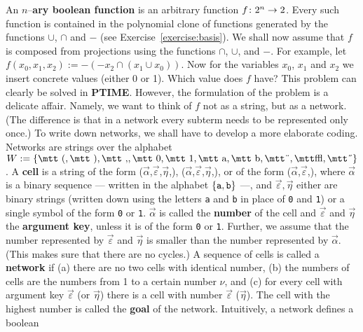 An $n$--\textbf{ary boolean function} 
is an arbitrary function
$f \colon 2^n \rightarrow 2$. Every such function is contained in the
polynomial clone of functions generated by the functions $\cup$,
$\cap$ and $-$ (see Exercise~\ref{exercise:basis}). We shall now 
assume that $f$ is composed from projections using the functions 
$\cap$, $\cup$, and $-$. For example, let 
$f(x_0, x_1, x_2) := - (- x_2 \cap (x_1 \cup x_0))$.
Now for the variables $x_0$, $x_1$ and $x_2$ we insert concrete
values (either 0 or 1). Which value does $f$ have? This problem 
can clearly be solved in {\bf PTIME}. However, the formulation of 
the problem is a delicate affair. Namely, we want to think of 
$f$ not as a string, but as a network. (The difference is that 
in a network every subterm needs to be represented only once.)
To write down networks, we shall have to develop a more elaborate 
coding. Networks are strings over the alphabet 
$W := \{\mbox{\mtt (}, \mbox{\mtt )}, \mbox{\mtt ,},
\mbox{\mtt 0}, \mbox{\mtt 1}, \mbox{\mtt a}, \mbox{\mtt b},
\mbox{\mtt\symbol{4}}, \mbox{\mtt\symbol{31}}, \mbox{\mtt\symbol{5}}\}$. 
A {\bf cell} is a string of the form
{\mtt ($\vec{\alpha}$,$\vec{\varepsilon}$,$\vec{\eta}$,)},
{\mtt ($\vec{\alpha}$,$\vec{\varepsilon}$,$\vec{\eta}$,)},
or of the form {\mtt ($\vec{\alpha}$,$\vec{\varepsilon}$,)},
where $\vec{\alpha}$ is a binary sequence --- written in the alphabet
$\{\mbox{\tt a}, \mbox{\tt b}\}$ ---, and
$\vec{\varepsilon}, \vec{\eta}$ either are binary strings
(written down using the letters {\tt a} and {\tt b} in place
of {\tt 0} and {\tt 1}) or a single symbol of the form {\tt 0}
or {\tt 1}. $\vec{\alpha}$ is called the \textbf{number} 
of the cell and $\vec{\varepsilon}$ and $\vec{\eta}$ the 
\textbf{argument key},
unless it is of the form {\tt 0} or {\tt 1}.  Further, we assume
that the number represented by $\vec{\varepsilon}$ and $\vec{\eta}$
is smaller than the number represented by $\vec{\alpha}$. (This
makes sure that there are no cycles.) A sequence of cells is called 
a \textbf{network} 
if (a) there are no two cells with identical number,
(b) the numbers of cells are the numbers from 1 to a
certain number $\nu$, and (c) for every cell with
argument key $\vec{\varepsilon}$ (or $\vec{\eta}$) there
is a cell with number $\vec{\varepsilon}$ ($\vec{\eta}$).
The cell with the highest number is called the \textbf{goal}
of the network. Intuitively, a network defines a boolean

